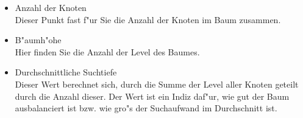\begin{itemize}
	\item {\sc Anzahl der Knoten} \\
			Dieser Punkt fast f"ur Sie die Anzahl der Knoten im Baum zusammen.
	\item {\sc B"aumh"ohe} \\
			Hier finden Sie die Anzahl der Level des Baumes.
	\item {\sc Durchschnittliche Suchtiefe} \\
			Dieser Wert berechnet sich, durch die Summe der Level aller Knoten geteilt durch die Anzahl dieser. Der Wert 
			ist ein Indiz daf"ur, wie gut der Baum ausbalanciert ist bzw. wie gro"s der Suchaufwand im Durchschnitt ist.
\end{itemize}

\bigskip
\bigskip
